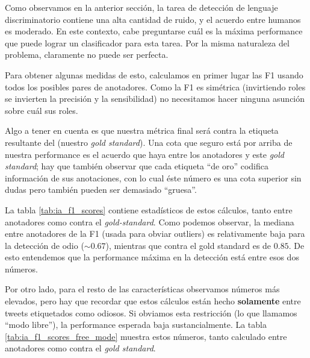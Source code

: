 Como observamos en la anterior sección, la tarea de detección de lenguaje discriminatorio contiene una alta cantidad de ruido, y el acuerdo entre humanos es moderado. En este contexto, cabe preguntarse cuál es la máxima performance que puede lograr un clasificador para esta tarea. Por la misma naturaleza del problema, claramente no puede ser perfecta.

Para obtener algunas medidas de esto, calculamos en primer lugar las F1 usando todos los posibles pares de anotadores. Como la F1 es simétrica (invirtiendo roles se invierten la precisión y la sensibilidad) no necesitamos hacer ninguna asunción sobre cuál sus roles.

Algo a tener en cuenta es que nuestra métrica final será contra la etiqueta resultante del (nuestro \emph{gold standard}). Una cota que seguro está por arriba de nuestra performance es el acuerdo que haya entre los anotadores y este \emph{gold standard}; hay que también observar que cada etiqueta ``de oro'' codifica información de sus anotaciones, con lo cual éste número es una cota superior sin dudas pero también pueden ser demasiado ``gruesa''.

La tabla \ref{tab:ia_f1_scores} contiene estadísticos de estos cálculos, tanto entre anotadores como contra el \emph{gold-standard}. Como podemos observar, la mediana entre anotadores de la F1 (usada para obviar outliers) es relativamente baja para la detección de odio ($\sim 0.67$), mientras que contra el gold standard es de $0.85$. De esto entendemos que la performance máxima en la detección está entre esos dos números.

Por otro lado, para el resto de las características observamos números más elevados, pero hay que recordar que estos cálculos están hecho \textbf{solamente} entre tweets etiquetados como odiosos. Si obviamos esta restricción (lo que llamamos ``modo libre''), la performance esperada baja sustancialmente. La tabla \ref{tab:ia_f1_scores_free_mode} muestra estos números, tanto calculado entre anotadores como contra el \emph{gold standard}.


